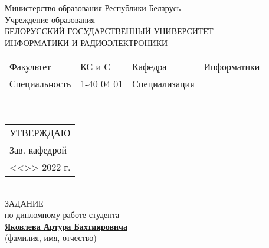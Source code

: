 {
  \thispagestyle{empty}
  \setlength{\parindent}{0em}

  \newcommand{\lineunderscore}{\uline{\hspace*{\fill}}}
  
  \newcommand{\raisedrule}[1]{\rule[#1]{\linegoal}{0.45pt}}
  \newcommand{\longunderline}[1]{\ul{#1}\raisedrule{-.75ex}}

  
  \begin{center}
    Министерство образования Республики Беларусь\\
    Учреждение образования\\
    БЕЛОРУССКИЙ ГОСУДАРСТВЕННЫЙ УНИВЕРСИТЕТ \\
    ИНФОРМАТИКИ И РАДИОЭЛЕКТРОНИКИ\\[1em]
  

  \begin{minipage}{\textwidth}
    \begin{flushleft}
      \begin{tabular}{ p{}p{}p{}p{} @{} }
        Факультет & КС и С & Кафедра & Информатики \\
        Специальность   & 1-40 04 01 & Специализация & 
      \end{tabular}
    \end{flushleft}
  \end{minipage}\\[1em]

  \begin{minipage}{\textwidth}
    \begin{flushright}
      \begin{tabular}{p{}}
        УТВЕРЖДАЮ \\[0.5em]
        \underline{\hspace*{7em}} Зав. кафедрой \\
        <<\underline{\hspace*{4ex}}>> \underline{\hspace*{7em}} 2022 г.
      \end{tabular}
    \end{flushright}
  \end{minipage}\\[1em]

  ЗАДАНИЕ\\
  по дипломному работе студента\\

  \uline{\hspace*{\fill}\textbf{Яковлева Артура Бахтияровича}\hspace*{\fill}}\\
  {\small (фамилия, имя, отчество) }
	

\end{center}}
